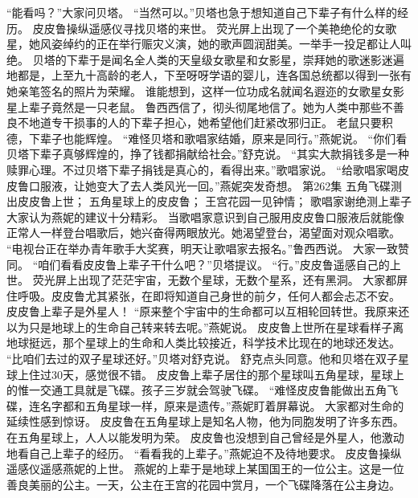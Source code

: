 \documentclass[a4paper,12pt,UTF8,twoside]{ctexbook}
\begin{document}
        “能看吗？”大家问贝塔。  
        “当然可以。”贝塔也急于想知道自己下辈子有什么样的经历。  
        皮皮鲁操纵遥感仪寻找贝塔的来世。  
        荧光屏上出现了一个美艳绝伦的女歌星，她风姿绰约的正在举行赈灾义演，她的歌声圆润甜美。一举手一投足都让人叫绝。  
        贝塔的下辈于是闻名全人类的天皇级女歌星和女影星，崇拜她的歌迷影迷遍地都是，上至九十高龄的老人，下至呀呀学语的婴儿，连各国总统都以得到一张有她亲笔签名的照片为荣耀。  
        谁能想到，这样一位功成名就闻名遐迩的女歌星女影星上辈子竟然是一只老鼠。  
        鲁西西信了，彻头彻尾地信了。她为人类中那些不善良不地道专干损事的人的下辈子担心，她希望他们赶紧改邪归正。  
        老鼠只要积德，下辈子也能辉煌。  
        “难怪贝塔和歌唱家结婚，原来是同行。”燕妮说。  
        “你们看贝塔下辈子真够辉煌的，挣了钱都捐献给社会。”舒克说。  
        “其实大款捐钱多是一种赎罪心理。不过贝塔下辈子捐钱是真心的，看得出来。”歌唱家说。  
        “给歌唱家喝皮皮鲁口服液，让她变大了去人类风光一回。”燕妮突发奇想。          第262集  
        五角飞碟测出皮皮鲁上世；  
        五角星球上的皮皮鲁；  
        王宫花园一见钟情；  
        歌唱家谢绝测上辈子    
        大家认为燕妮的建议十分精彩。  
        当歌唱家意识到自己服用皮皮鲁口服液后就能像正常人一样登台唱歌后，她兴奋得两眼放光。她渴望登台，渴望面对观众唱歌。  
        “电视台正在举办青年歌手大奖赛，明天让歌唱家去报名。”鲁西西说。  
        大家一致赞同。  
        “咱们看看皮皮鲁上辈子干什么吧？”贝塔提议。  
        “行。”皮皮鲁遥感自己的上世。  
        荧光屏上出现了茫茫宇宙，无数个星球，无数个星系，还有黑洞。        
        大家都屏住呼吸。皮皮鲁尤其紧张，在即将知道自己身世的前夕，任何人都会忐忑不安。  
        皮皮鲁上辈子是外星人！  
        “原来整个宇宙中的生命都可以互相轮回转世。我原来还以为只是地球上的生命自己转来转去呢。”燕妮说。  
        皮皮鲁上世所在星球看样子离地球挺远，那个星球上的生命和人类比较接近，科学技术比现在的地球还发达。  
        “比咱们去过的双子星球还好。”贝塔对舒克说。  
        舒克点头同意。他和贝塔在双子星球上住过30天，感觉很不错。  
        皮皮鲁上辈子居住的那个星球叫五角星球，星球上的惟一交通工具就是飞碟。孩子三岁就会驾驶飞碟。  
        “难怪皮皮鲁能做出五角飞碟，连名字都和五角星球一样，原来是遗传。”燕妮盯着屏幕说。  
        大家都对生命的延续性感到惊讶。  
        皮皮鲁在五角星球上是知名人物，他为同胞发明了许多东西。在五角星球上，人人以能发明为荣。  
        皮皮鲁也没想到自己曾经是外星人，他激动地看自己上辈子的经历。  
        “看看我的上辈子。”燕妮迫不及待地要求。  
        皮皮鲁操纵遥感仪遥感燕妮的上世。        
        燕妮的上辈于是地球上某国国王的一位公主。这是一位善良美丽的公主。一天，公主在王宫的花园中赏月，一个飞碟降落在公主身边。  
\end{document}
